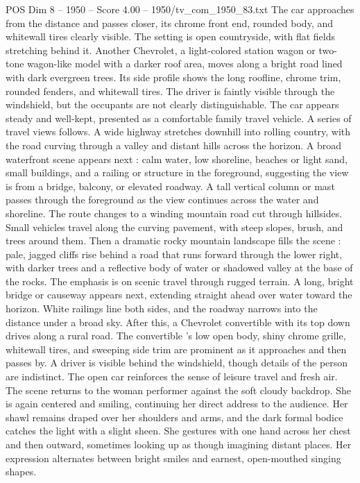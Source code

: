\begin{textsample}{POS Dim 8 – 1950 – Score 4.00 – 1950/tv\_com\_1950\_83.txt}
The car approaches from the distance and passes closer, its chrome front end, rounded body, and whitewall tires clearly visible.
The setting is open countryside, with flat fields stretching behind it.
Another Chevrolet, a light-colored station wagon or two-tone wagon-like model with a darker roof area, moves along a bright road lined with dark evergreen trees.
Its side profile shows the long roofline, chrome trim, rounded fenders, and whitewall tires.
The driver is faintly visible through the windshield, but the occupants are not clearly distinguishable.
The car appears steady and well-kept, presented as a comfortable family travel vehicle.
A series of travel views follows.
A wide highway stretches downhill into rolling country, with the road curving through a valley and distant hills across the horizon.
A broad waterfront scene appears next : calm water, low shoreline, beaches or light sand, small buildings, and a railing or structure in the foreground, suggesting the view is from a bridge, balcony, or elevated roadway.
A tall vertical column or mast passes through the foreground as the view continues across the water and shoreline.
The route changes to a winding mountain road cut through hillsides.
Small vehicles travel along the curving pavement, with steep slopes, brush, and trees around them.
Then a dramatic rocky mountain landscape fills the scene : pale, jagged cliffs rise behind a road that runs forward through the lower right, with darker trees and a reflective body of water or shadowed valley at the base of the rocks.
The emphasis is on scenic travel through rugged terrain.
A long, bright bridge or causeway appears next, extending straight ahead over water toward the horizon.
White railings line both sides, and the roadway narrows into the distance under a broad sky.
After this, a Chevrolet convertible with its top down drives along a rural road.
The convertible ’s low open body, shiny chrome grille, whitewall tires, and sweeping side trim are prominent as it approaches and then passes by.
A driver is visible behind the windshield, though details of the person are indistinct.
The open car reinforces the sense of leisure travel and fresh air.
The scene returns to the woman performer against the soft cloudy backdrop.
She is again centered and smiling, continuing her direct address to the audience.
Her shawl remains draped over her shoulders and arms, and the dark formal bodice catches the light with a slight sheen.
She gestures with one hand across her chest and then outward, sometimes looking up as though imagining distant places.
Her expression alternates between bright smiles and earnest, open-mouthed singing shapes.

\end{textsample}
